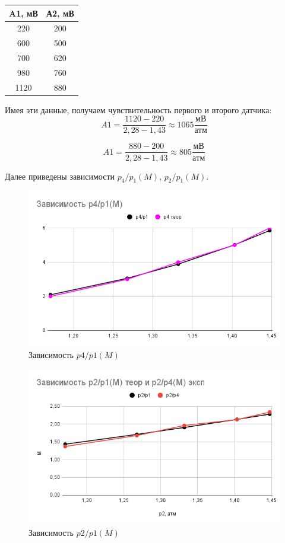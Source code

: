 \documentclass[a4paper,14pt]{article}
\begin{document}
\begin{table}[h]
    \centering
    \begin{tabular}{|c|c|} \hline
        A1, мВ & А2, мВ \\ \hline
        220	& 200 \\ \hline
        600	& 500 \\ \hline
        700	& 620 \\ \hline
        980	& 760 \\ \hline
        1120 & 880 \\ \hline
    \end{tabular}
\end{table}

Имея эти данные, получаем чувствительность первого и второго датчика:
$$
A1 = \frac{1120-220}{2,28-1,43} \approx 1065 \frac{мВ}{атм}
$$

$$
A1 = \frac{880-200}{2,28-1,43} \approx 805 \frac{мВ}{атм}
$$



Далее приведены зависимости $p_4/p_1(M)$, $p_2/p_1(M)$. 

\begin{figure}[h]
    \centering
    \includegraphics[scale=0.7]{p4p1.png}
    \caption{Зависимость $p4/p1(M)$}
    \label{result}
\end{figure}

\begin{figure}[h]
    \centering
    \includegraphics[scale=0.7]{p2p1.png}
    \caption{Зависимость $p2/p1(M)$}
\end{figure}
\end{document}
